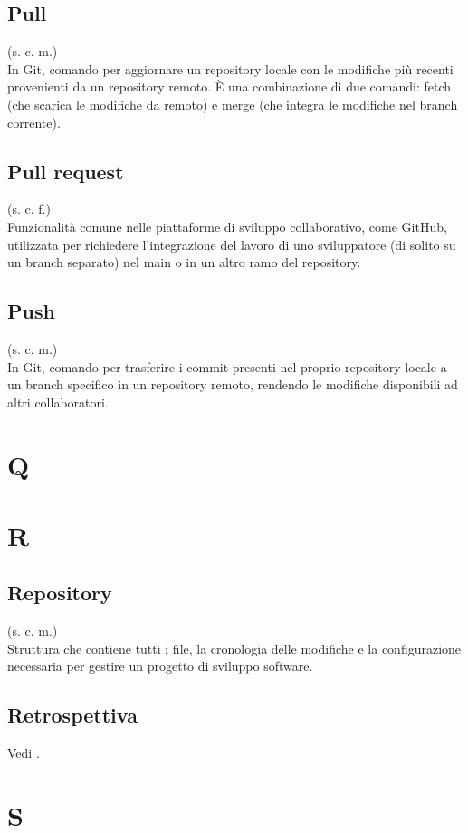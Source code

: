     \subsection{Pull}
    (s. c. m.)\\
    In Git, comando per aggiornare un repository locale con le modifiche più recenti provenienti 
    da un repository remoto. È una combinazione di due comandi: fetch (che scarica le modifiche 
    da remoto) e merge (che integra le modifiche nel branch corrente).
    \subsection{Pull request}
    (s. c. f.)\\
    Funzionalità comune nelle piattaforme di sviluppo collaborativo, come GitHub, utilizzata per 
    richiedere l'integrazione del lavoro di uno sviluppatore (di solito su un branch separato) 
    nel main o in un altro ramo del repository.
    \subsection{Push}
    (s. c. m.)\\
    In Git, comando per trasferire i commit presenti nel proprio repository locale a un 
    branch specifico in un repository remoto, rendendo le modifiche disponibili 
    ad altri collaboratori.

\pagebreak
\section{Q}
\pagebreak
\section{R}
    \subsection{Repository}
    \label{Repository}
    (s. c. m.)\\
    Struttura che contiene tutti i file, la cronologia delle modifiche e la 
    configurazione necessaria per gestire un progetto di sviluppo software.
    \subsection{Retrospettiva}
    Vedi .
\pagebreak
\section{S}

